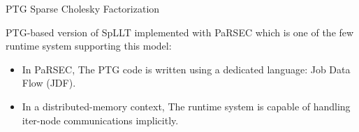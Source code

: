 \documentclass[unknownkeysallowed]{beamer}
\newcommand{\db}[1]{\textcolor{mblue}{#1\xspace}}
\begin{document}
\begin{frame}{PTG Sparse Cholesky Factorization}
  
  \db{PTG-based} version of SpLLT implemented with \db{PaRSEC} which
  is one of the few runtime system supporting this model:

  \vspace{0.5cm}

  \begin{itemize}
    \item In PaRSEC, The PTG code is written using a dedicated
      language: \db{Job Data Flow} (JDF).

      \vspace{0.5cm}
      
    \item In a \alert{distributed-memory context}, The runtime system
      is capable of handling iter-node communications implicitly.
  \end{itemize}
    
\end{frame}
\end{document}
